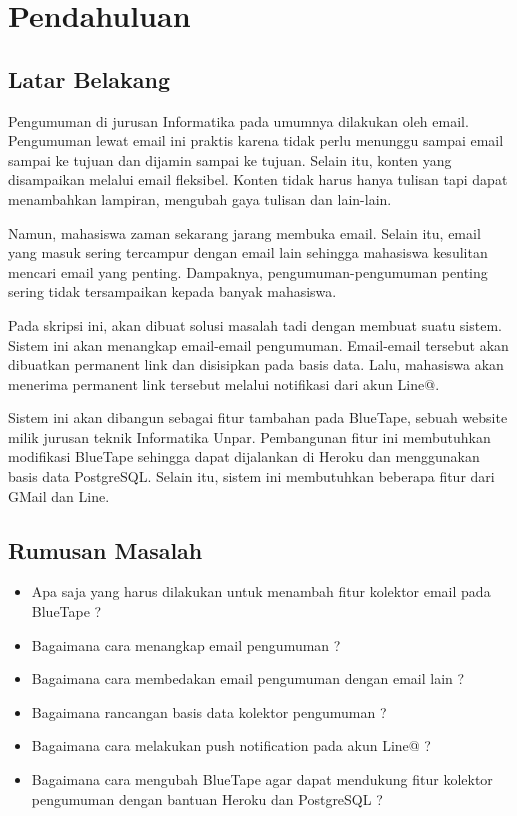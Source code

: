 \chapter{Pendahuluan}
\label{chap:pendahuluan}
   
\section{Latar Belakang}
\label{sec:latarBelakang}
Pengumuman di jurusan Informatika pada umumnya dilakukan oleh email. Pengumuman lewat email ini praktis karena tidak perlu menunggu sampai email sampai ke tujuan dan dijamin sampai ke tujuan. Selain itu, konten yang disampaikan melalui email fleksibel. Konten tidak harus hanya tulisan tapi dapat menambahkan lampiran, mengubah gaya tulisan dan lain-lain.

Namun, mahasiswa zaman sekarang jarang membuka email. Selain itu, email yang masuk sering tercampur dengan email lain sehingga mahasiswa kesulitan mencari email yang penting. Dampaknya, pengumuman-pengumuman penting sering tidak tersampaikan kepada banyak mahasiswa.

Pada skripsi ini, akan dibuat solusi masalah tadi dengan membuat suatu sistem. Sistem ini akan menangkap email-email pengumuman. Email-email tersebut akan dibuatkan permanent link dan disisipkan pada basis data. Lalu, mahasiswa akan menerima permanent link tersebut melalui notifikasi dari akun Line@.

Sistem ini akan dibangun sebagai fitur tambahan pada BlueTape, sebuah website milik jurusan teknik Informatika Unpar. Pembangunan fitur ini membutuhkan modifikasi BlueTape sehingga dapat dijalankan di Heroku dan menggunakan basis data PostgreSQL. Selain itu, sistem ini membutuhkan beberapa fitur dari GMail dan Line.

\section{Rumusan Masalah}
\label{sec:rumusanmasalah}
\begin{itemize}
\item Apa saja yang harus dilakukan untuk menambah fitur kolektor email pada BlueTape ?
\item Bagaimana cara menangkap email pengumuman ?
\item Bagaimana cara membedakan email pengumuman dengan email lain ?
\item Bagaimana rancangan basis data kolektor pengumuman ?
\item Bagaimana cara melakukan push notification pada akun Line@ ?
\item Bagaimana cara mengubah BlueTape agar dapat mendukung fitur kolektor pengumuman dengan bantuan Heroku dan PostgreSQL ?
\end{itemize}

